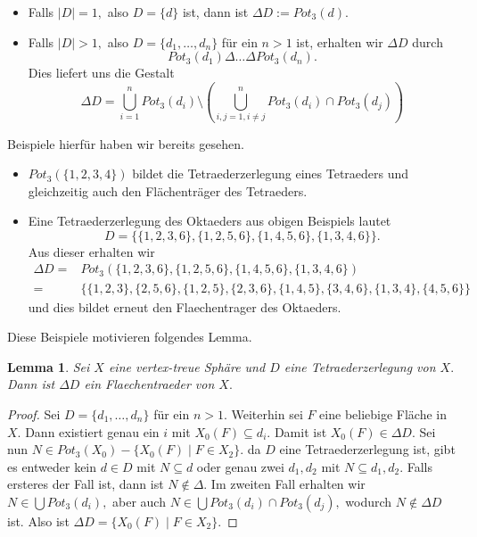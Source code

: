 \documentclass[12pt,titlepage,twoside,cleardoublepage]{article}
\theoremstyle{nummermitklammern}
\newtheorem{lemma}[temp]{Lemma}
\newtheorem{lemma}[zahl]{Lemma}
\numberwithin{equation}{section}
\begin{document}
\begin{itemize}
\item Falls $\vert D\vert =1,$ also $D=\{d\}$ ist, dann ist $\Delta D:=Pot_3(d).$
\item Falls $\vert D\vert >1,$ also $D=\{d_1,\ldots,d_n\}$ für ein $n>1$ ist, erhalten wir $\Delta D$ durch
\[
Pot_3(d_1)\Delta \ldots \Delta Pot_3(d_n).
\]
Dies liefert uns die Gestalt 
\[
\Delta D=\bigcup^n_{i=1} Pot_3(d_i)\setminus  (\bigcup^n_{i,j=1,i\neq j}Pot_3(d_i)\cap Pot_3(d_j))
\]
\end{itemize} 
Beispiele hierfür haben wir bereits gesehen.
\begin{itemize}
\item $Pot_3(\{1,2,3,4\})$ bildet die Tetraederzerlegung eines Tetraeders und gleichzeitig auch den Flächenträger des Tetraeders.
\item Eine Tetraederzerlegung des Oktaeders aus obigen Beispiels lautet
 \[
D=\{\{1,2,3,6\},\{1,2,5,6\},\{1,4,5,6\},\{1,3,4,6\}\}. 
 \]
 Aus dieser erhalten wir 
 \begin{align*}
\Delta D=&Pot_3(\{1,2,3,6\},\{1,2,5,6\},\{1,4,5,6\},\{1,3,4,6\})\\
=&\{\{1,2,3\},\{2,5,6\},\{1,2,5\},\{2,3,6\},\{1,4,5\},\{3,4,6\},\{1,3,4\},\{4,5,6\}\}
\end{align*}
und dies bildet erneut den Flaechentrager des Oktaeders.
\end{itemize} 
Diese Beispiele motivieren folgendes Lemma.
\begin{lemma}
Sei $X$ eine vertex-treue Sphäre und $D$ eine Tetraederzerlegung von $X.$ Dann ist $\Delta D$ ein Flaechentraeder von $X.$
\end{lemma}
\begin{proof}
Sei $D=\{d_1,\ldots,d_n\}$ für ein $n>1.$
Weiterhin sei $F$ eine beliebige Fläche in $X.$ Dann existiert genau ein $i$ mit $X_0(F)\subseteq d_i.$ Damit ist $X_0(F) \in \Delta D.$ Sei nun $N\in Pot_3(X_0)-\{X_0(F)\mid F\in X_2\}.$ da $D$ eine Tetraederzerlegung ist, gibt es entweder kein $d\in D$ mit $N\subseteq d$ oder genau zwei $d_1,d_2$ mit $N\subseteq d_1,d_2.$ Falls ersteres der Fall ist, dann ist $N\notin \Delta.$ Im zweiten Fall erhalten wir $N\in \bigcup Pot_3(d_i),$ aber auch $N\in \bigcup Pot_3(d_i)\cap Pot_3(d_j),$ wodurch $N\notin \Delta D$ ist. 
Also ist $\Delta D=\{X_0(F)\mid F\in X_2\}.$ 
\end{proof}
\end{document}
